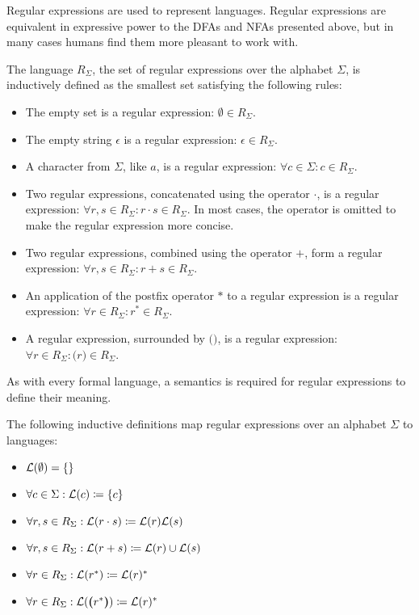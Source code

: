 Regular expressions are used to represent languages.
Regular expressions are equivalent in expressive power to the DFAs and NFAs presented above,
but in many cases humans find them more pleasant to work with.

\begin{definition}
    The language $R_\Sigma$, the set of regular expressions over the alphabet $\Sigma$,
    is inductively defined as the smallest set satisfying the following rules:

    \begin{itemize}
        \item The empty set is a regular expression:
        $\emptyset \in R_\Sigma$.
        \item The empty string $\epsilon$ is a regular expression:
        $\epsilon \in R_\Sigma$.
        \item A character from $\Sigma$, like $a$, is a regular expression:
        $\forall c \in \Sigma: c \in R_\Sigma$.
        \item Two regular expressions, concatenated using the operator $\cdot$, is a regular expression:
        $\forall r, s \in R_\Sigma: r \cdot s \in R_\Sigma$.
        In most cases, the operator is omitted to make the regular expression more concise.
        \item Two regular expressions, combined using the operator $+$, form a regular expression:
        $\forall r, s \in R_\Sigma: r + s \in R_\Sigma$.
        \item An application of the postfix operator $\ast$ to a regular expression is a regular expression:
        $\forall r \in R_\Sigma: r^\ast \in R_\Sigma$.
        \item A regular expression, surrounded by $\bm{(}\bm{)}$, is a regular expression:
        $\forall r \in R_\Sigma: \bm{(}r\bm{)} \in R_\Sigma$.
    \end{itemize}
\end{definition}

As with every formal language, a semantics is required for regular expressions to define their meaning.

\begin{definition}
    The following inductive definitions map regular expressions over an alphabet $\Sigma$ to languages:

    \begin{itemize}
        \item $\mathcal{L}(\emptyset) = \{\}$
        \item $\forall c \in \Sigma: \mathcal{L}(c) \coloneqq \{c\} $
        \item $\forall r, s \in R_\Sigma: \mathcal{L}(r \cdot s) \coloneqq \mathcal{L}(r) \mathcal{L}(s)$
        \item $\forall r, s \in R_\Sigma: \mathcal{L}(r + s) \coloneqq \mathcal{L}(r) \cup \mathcal{L}(s)$
        \item $\forall r \in R_\Sigma: \mathcal{L}(r^\ast) \coloneqq \mathcal{L}(r)^\ast$
        \item $\forall r \in R_\Sigma: \mathcal{L}(\bm{(}r^\ast\bm{)}) \coloneqq \mathcal{L}(r)^\ast$
    \end{itemize}
\end{definition}
